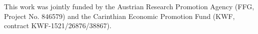 This work was jointly funded by the Austrian Research Promotion Agency (FFG, Project No. 846579) and the Carinthian Economic Promotion Fund (KWF, contract KWF-1521/26876/38867).
